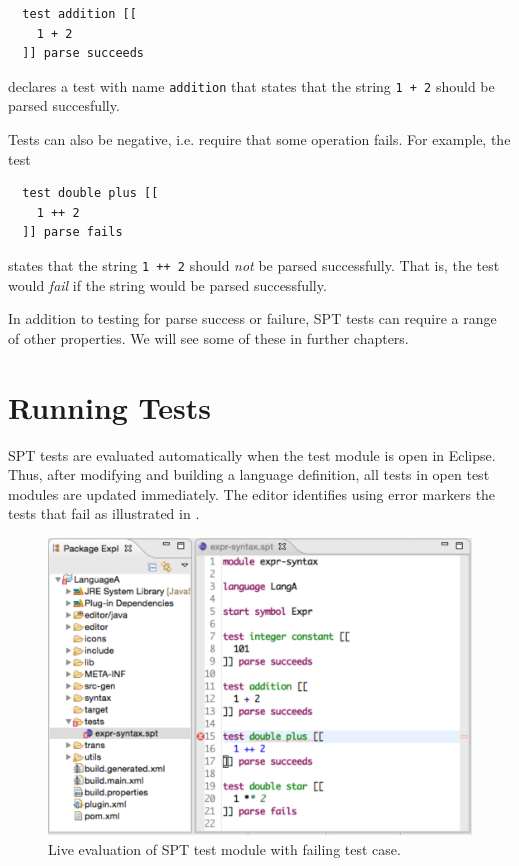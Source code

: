 \begin{verbatim}
  test addition [[
    1 + 2
  ]] parse succeeds
\end{verbatim}

declares a test with name \texttt{addition} that states that the string
\texttt{1 + 2} should be parsed succesfully.
 
Tests can also be negative, i.e. require that some operation fails. For example, 
the test

\begin{verbatim}
  test double plus [[
    1 ++ 2
  ]] parse fails
\end{verbatim}

states that the string \texttt{1 ++ 2} should \emph{not} be parsed successfully.
That is, the test would \emph{fail} if the string would be parsed successfully.

In addition to testing for parse success or failure, SPT tests can require a
range of other properties. We will see some of these in further chapters.

\section{Running Tests}

SPT tests are evaluated automatically when the test module is open in Eclipse.
Thus, after modifying and building a language definition, all tests in open test
modules are updated immediately.
The editor identifies using error markers the tests that fail as illustrated in 
.

\begin{figure}[t]
\includegraphics[width=\hsize]{tests/expr-syntax-spt.pdf}
\caption{Live evaluation of SPT test module with failing test case.}
\end{figure}

